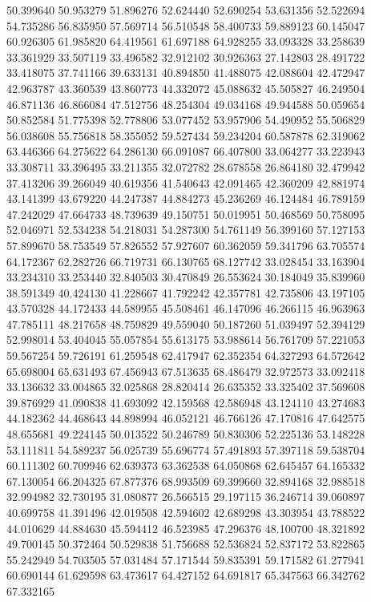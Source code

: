 50.399640
50.953279
51.896276
52.624440
52.690254
53.631356
52.522694
54.735286
56.835950
57.569714
56.510548
58.400733
59.889123
60.145047
60.926305
61.985820
64.419561
61.697188
64.928255
33.093328
33.258639
33.361929
33.507119
33.496582
32.912102
30.926363
27.142803
28.491722
33.418075
37.741166
39.633131
40.894850
41.488075
42.088604
42.472947
42.963787
43.360539
43.860773
44.332072
45.088632
45.505827
46.249504
46.871136
46.866084
47.512756
48.254304
49.034168
49.944588
50.059654
50.852584
51.775398
52.778806
53.077452
53.957906
54.490952
55.506829
56.038608
55.756818
58.355052
59.527434
59.234204
60.587878
62.319062
63.446366
64.275622
64.286130
66.091087
66.407800
33.064277
33.223943
33.308711
33.396495
33.211355
32.072782
28.678558
26.864180
32.479942
37.413206
39.266049
40.619356
41.540643
42.091465
42.360209
42.881974
43.141399
43.679220
44.247387
44.884273
45.236269
46.124484
46.789159
47.242029
47.664733
48.739639
49.150751
50.019951
50.468569
50.758095
52.046971
52.534238
54.218031
54.287300
54.761149
56.399160
57.127153
57.899670
58.753549
57.826552
57.927607
60.362059
59.341796
63.705574
64.172367
62.282726
66.719731
66.130765
68.127742
33.028454
33.163904
33.234310
33.253440
32.840503
30.470849
26.553624
30.184049
35.839960
38.591349
40.424130
41.228667
41.792242
42.357781
42.735806
43.197105
43.570328
44.172433
44.589955
45.508461
46.147096
46.266115
46.963963
47.785111
48.217658
48.759829
49.559040
50.187260
51.039497
52.394129
52.998014
53.404045
55.057854
55.613175
53.988614
56.761709
57.221053
59.567254
59.726191
61.259548
62.417947
62.352354
64.327293
64.572642
65.698004
65.631493
67.456943
67.513635
68.486479
32.972573
33.092418
33.136632
33.004865
32.025868
28.820414
26.635352
33.325402
37.569608
39.876929
41.090838
41.693092
42.159568
42.586948
43.124110
43.274683
44.182362
44.468643
44.898994
46.052121
46.766126
47.170816
47.642575
48.655681
49.224145
50.013522
50.246789
50.830306
52.225136
53.148228
53.111811
54.589237
56.025739
55.696774
57.491893
57.397118
59.538704
60.111302
60.709946
62.639373
63.362538
64.050868
62.645457
64.165332
67.130054
66.204325
67.877376
68.993509
69.399660
32.894168
32.988518
32.994982
32.730195
31.080877
26.566515
29.197115
36.246714
39.060897
40.699758
41.391496
42.019508
42.594602
42.689298
43.303954
43.788522
44.010629
44.884630
45.594412
46.523985
47.296376
48.100700
48.321892
49.700145
50.372464
50.529838
51.756688
52.536824
52.837172
53.822865
55.242949
54.703505
57.031484
57.171544
59.835391
59.171582
61.277941
60.690144
61.629598
63.473617
64.427152
64.691817
65.347563
66.342762
67.332165

